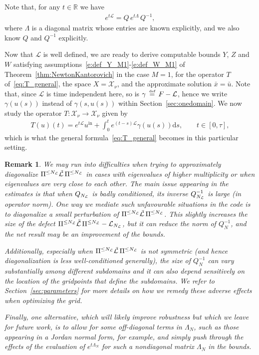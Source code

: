 \documentclass[10pt,a4paper]{article}
\theoremstyle{plain}
\newtheorem{remark}[theorem]{Remark}
\newcommand{\RR}{\mathbb R}
\renewcommand{\L}{\mathcal{L}}
\newcommand{\tL}{\tilde{\mathcal{L}}}
\newcommand{\X}{\mathcal{X}}
\newcommand{\bu}{\bar{u}}
\newcommand{\1}{\mathbf{1}}
\renewcommand{\d}{\mathrm{d}}
\newcommand{\uin}{{u^{\mathrm{in}}}}
\newcommand{\bydef}{\,\stackrel{\mbox{\tiny\textnormal{\raisebox{0ex}[0ex][0ex]{def}}}}{=}\,}
\newcommand{\NL}{N_{\text{\tiny{$\L$}}}}
\begin{document}
Note that, for any $t\in\RR$ we have
\begin{align*}
e^{t\L} = Q\, e^{t\Lambda}\, Q^{-1},
\end{align*}
where $\Lambda$ is a diagonal matrix whose entries are known explicitly, and we also know $Q$ and $Q^{-1}$ explicitly.


\medskip


Now that $\L$ is well defined, we are ready to derive computable bounds $Y$, $Z$ and $W$ satisfying assumptions~\eqref{e:def_Y_M1}-\eqref{e:def_W_M1} of Theorem~\ref{thm:NewtonKantorovich} in the case $M=1$, for the operator $T$ of~\eqref{eq:T_general}, the space $X=\X_\nu$, and the approximate solution $\bar{x} = \bu$. 
Note that, since $\L$ is time independent here, so is $\gamma \bydef F - \L$, hence we write $\gamma(u(s))$ instead of $\gamma(s,u(s))$ within Section~\ref{sec:onedomain}. We now study the operator $T:\X_\nu\to\X_\nu$ given by
\begin{align}
\label{eq:T_L}
T(u)(t) = e^{t\L} \uin + \int_0^t e^{(t-s)\L} \gamma(u(s)) \d s,\qquad t\in[0,\tau],
\end{align}
which is what the general formula~\eqref{eq:T_general} becomes in this particular setting.


\begin{remark}\label{rem:diagonalization}
We may run into difficulties when trying to approximately diagonalize $\Pi^{\leq \NL} \tL \,\Pi^{\leq \NL}$ in cases with eigenvalues of higher multiplicity or when eigenvalues are very close to each other. The main issue appearing in the estimates is that when $Q_{\NL}$ is badly conditioned, its inverse $Q_{\NL}^{-1}$ is large (in operator norm). One way we mediate such unfavourable situations in the code is to diagonalize a small perturbation of $\Pi^{\leq \NL} \tL \,\Pi^{\leq \NL}$. This slightly increases the size of the defect $\Pi^{\leq \NL} \tL \,\Pi^{\leq \NL} - \L_{\NL}$, but it can reduce the norm of $Q_N^{-1}$, and the net result may be an improvement of the bounds. 

Additionally, especially when $\Pi^{\leq \NL} \tL \,\Pi^{\leq \NL}$ is not symmetric (and hence diagonalization is less well-conditioned generally), the size of $Q_N^{-1}$ can vary substantially among different subdomains and it can also depend sensitively on the location of the gridpoints that define the subdomains. We refer to Section~\ref{sec:parameters} for more details on how we remedy these adverse effects when optimizing the grid. 

Finally, one alternative, which will likely improve robustness but which we leave for future work, is to allow for some off-diagonal terms in $\Lambda_N$, such as those appearing in a Jordan normal form, for example, and simply push through the effects of the evaluation of $e^{t\Lambda_N}$ for such a nondiagonal matrix $\Lambda_N$ in the bounds.
\end{remark}
\end{document}
